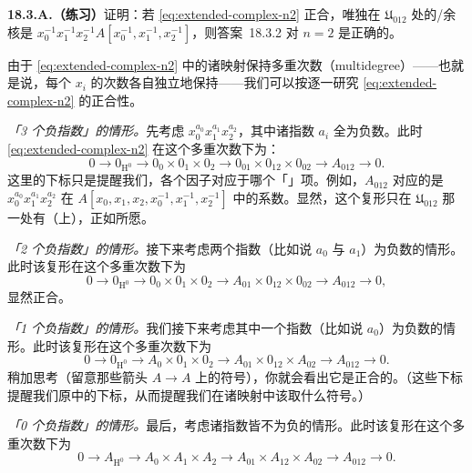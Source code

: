 \textbf{18.3.A.（练习）}\quad 证明：若 \eqref{eq:extended-complex-n2} 正合，唯独在 $\mathfrak{U}_{012}$ 处的\trCohomology{}/余核是 $x_0^{-1}x_1^{-1}x_2^{-1}A[x_0^{-1},x_1^{-1},x_2^{-1}]$，则\mbox{答案~18.3.2} 对 $n=2$ 是正确的。

由于 \eqref{eq:extended-complex-n2} 中的诸映射保持多重次数（multidegree）——也就是说，每个 $x_i$ 的次数各自独立地保持——我们可以按\trMonomial{}逐一研究 \eqref{eq:extended-complex-n2} 的正合性。

\emph{「3 个负指数」的情形。}\quad 先考虑\trMonomial{} $x_0^{a_0}x_1^{a_1}x_2^{a_2}$，其中诸指数 $a_i$ 全为负数。此时 \eqref{eq:extended-complex-n2} 在这个多重次数下为：
\[
0\longrightarrow 0_{\mathrm{H}^0}\longrightarrow 0_0\times 0_1\times 0_2\longrightarrow 0_{01}\times 0_{12}\times 0_{02}\longrightarrow A_{012}\longrightarrow 0.
\]
这里的下标只是提醒我们，各个因子对应于哪个「\trCech{}」项。例如，$A_{012}$ 对应的是 $x_0^{a_0}x_1^{a_1}x_2^{a_2}$ 在 $A[x_0,x_1,x_2,x_0^{-1},x_1^{-1},x_2^{-1}]$ 中的系数。显然，这个复形只在 $\mathfrak{U}_{012}$ 那一处有（上）\trHomology，正如所愿。

\emph{「2 个负指数」的情形。}\quad 接下来考虑两个指数（比如说 $a_0$ 与 $a_1$）为负数的情形。此时该复形在这个多重次数下为
\[
0\longrightarrow 0_{\mathrm{H}^0}\longrightarrow 0_0\times 0_1\times 0_2\longrightarrow A_{01}\times 0_{12}\times 0_{02}\longrightarrow A_{012}\longrightarrow 0,
\]
显然正合。

\emph{「1 个负指数」的情形。}\quad 我们接下来考虑其中一个指数（比如说 $a_0$）为负数的情形。此时该复形在这个多重次数下为
\[
0\longrightarrow 0_{\mathrm{H}^0}\longrightarrow A_0\times 0_1\times 0_2\longrightarrow A_{01}\times 0_{12}\times A_{02}\longrightarrow A_{012}\longrightarrow 0.
\]
稍加思考（留意那些箭头 $A\to A$ 上的符号），你就会看出它是正合的。（这些下标提醒我们原\trCech\trComplexN{}中的下标，从而提醒我们在诸映射中该取什么符号。）

\emph{「0 个负指数」的情形。}\quad 最后，考虑诸指数皆不为负的情形。此时该复形在这个多重次数下为
\begin{equation*}\tag{18.3.2.3}\label{eq:multidegree-zero-negative}
0\longrightarrow A_{\mathrm{H}^0}\longrightarrow A_0\times A_1\times A_2\longrightarrow A_{01}\times A_{12}\times A_{02}\longrightarrow A_{012}\longrightarrow 0.
\end{equation*}


